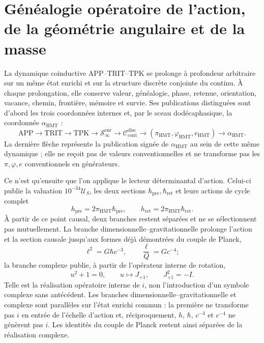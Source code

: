 
\section{Généalogie opératoire de l'action, de la géométrie angulaire et de la masse}
\label{sec:l9s102:transicion-constantes-accion-geometria-masas}

La dynamique coinductive APP--TRIT--TPK se prolonge à profondeur arbitraire
sur un même état enrichi et sur la structure discrète conjointe du
continu. À chaque prolongation, elle conserve valeur, généalogie, phase, retenue,
orientation, vacance, chemin, frontière, mémoire et survie. Ses
publications distinguées sont d'abord les trois coordonnées internes et,
par le sceau dodécaphasique, la coordonnée \(\alpha_{\mathrm{HMT}}\) :
\[
 \mathrm{APP}\longrightarrow\mathrm{TRIT}\longrightarrow\mathrm{TPK}
 \longrightarrow\mathcal S_{\infty}^{\mathrm{enr}}
 \longrightarrow\mathcal C_{\mathrm{cont}}^{\mathrm{disc}}
 \longrightarrow(\pi_{\mathrm{HMT}},\varphi_{\mathrm{HMT}},e_{\mathrm{HMT}})
 \longrightarrow\alpha_{\mathrm{HMT}}.
\]
La dernière flèche représente la publication signée de
\(\alpha_{\mathrm{HMT}}\) au sein de cette même dynamique ; elle ne reçoit pas de valeurs
conventionnelles et ne transforme pas les \(\pi,\varphi,e\) conventionnels en générateurs.

Ce n'est qu'ensuite que l'on applique le lecteur déterminantal d'action. Celui-ci publie la
valuation \(10^{-34}\mathcal U_S\), les deux sections
\(\hbar_{\mathrm{pre}},\hbar_{\mathrm{ret}}\) et leurs actions de cycle
complet
\[
 h_{\mathrm{pre}}=2\pi_{\mathrm{HMT}}\hbar_{\mathrm{pre}},
 \qquad
 h_{\mathrm{ret}}=2\pi_{\mathrm{HMT}}\hbar_{\mathrm{ret}}.
\]
À partir de ce point causal, deux branches restent séparées et ne se
sélectionnent pas mutuellement. La branche dimensionnelle--gravitationnelle prolonge l'action et
la section causale jusqu'aux formes déjà démontrées du couple de Planck,
\[
 \ell^{2}=G\hbar c^{-3},
 \qquad
 \frac{\ell}{Q}=Gc^{-4};
\]
la branche complexe publie, à partir de l'opérateur interne de rotation,
\[
 u^2+1=0,
 \qquad u\longmapsto J_{+1},
 \qquad J_{+1}^{2}=-I.
\]
Telle est la réalisation opératoire interne de \(i\), non l'introduction d'un
symbole complexe sans antécédent. Les branches dimensionnelle--gravitationnelle et
complexe sont parallèles sur l'état enrichi commun : la première ne
transforme pas \(i\) en entrée de l'échelle d'action et, réciproquement,
\(h\), \(\hbar\), \(c^{-3}\) et \(c^{-4}\) ne génèrent pas \(i\). Les identités
du couple de Planck restent ainsi séparées de la réalisation complexe.

